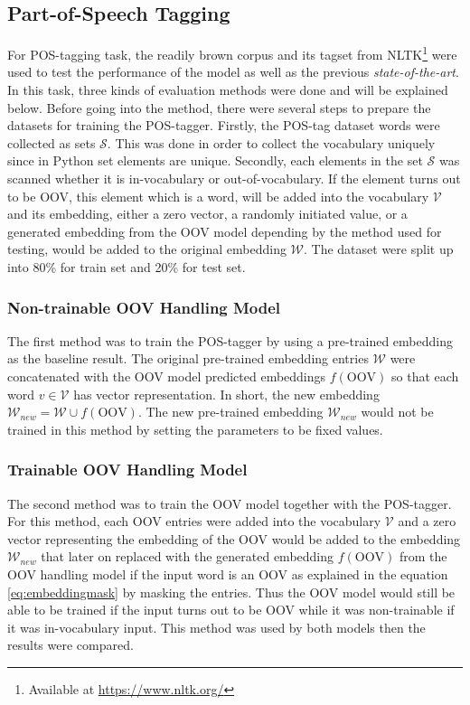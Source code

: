     \subsection{Part-of-Speech Tagging}
        For POS-tagging task, the readily brown corpus and its tagset
        from NLTK\footnote{Available at \url{https://www.nltk.org/}}
        were used to test the performance of the model as well as the
        previous \textit{state-of-the-art}. In this task, three kinds of
        evaluation methods were done and will be explained below.
        Before going into the method, there were several steps to
        prepare the datasets for training the POS-tagger. Firstly, the
        POS-tag dataset words were collected as sets $\mathcal{S}$.
        This was done in order to collect the vocabulary uniquely
        since in Python set elements are unique. Secondly, each
        elements in the set $\mathcal{S}$ was scanned whether it is
        in-vocabulary or out-of-vocabulary. If the element turns out
        to be OOV, this element which is a word, will be added into
        the vocabulary $\mathcal{V}$ and its embedding, either a zero
        vector, a randomly initiated value, or a generated embedding
        from the OOV model depending by the method used for testing,
        would be added to the original embedding $\mathcal{W}$. The
        dataset were split up into 80\% for train set and 20\% for
        test set.

        \subsubsection{Non-trainable OOV Handling Model}
        The first method was to train the POS-tagger by using a
        pre-trained embedding as the baseline result. The original
        pre-trained embedding entries $\mathcal{W}$ were concatenated
        with the OOV model predicted embeddings $f(\text{OOV})$ so
        that each word $v \in \mathcal{V}$ has vector representation.
        In short, the new embedding $\mathcal{W}_{new} = \mathcal{W}
        \cup f(\text{OOV})$. The new pre-trained embedding
        $\mathcal{W}_{new}$ would not be trained in this method by
        setting the parameters to be fixed values.

        \subsubsection{Trainable OOV Handling Model}
        The second method was to train the OOV model together with the
        POS-tagger. For this method, each OOV entries were added into
        the vocabulary $\mathcal{V}$ and a zero vector representing the
        embedding of the OOV would be added to the embedding
        $\mathcal{W}_{new}$ that later on replaced with the generated
        embedding $f(\text{OOV})$ from the OOV handling model if the input word is an OOV as
        explained in the equation \ref{eq:embeddingmask} by masking
        the entries. Thus the OOV model would still be able to be
        trained if the input turns out to be OOV while it was
        non-trainable if it was in-vocabulary input. This method was
        used by both models then the results were compared.


